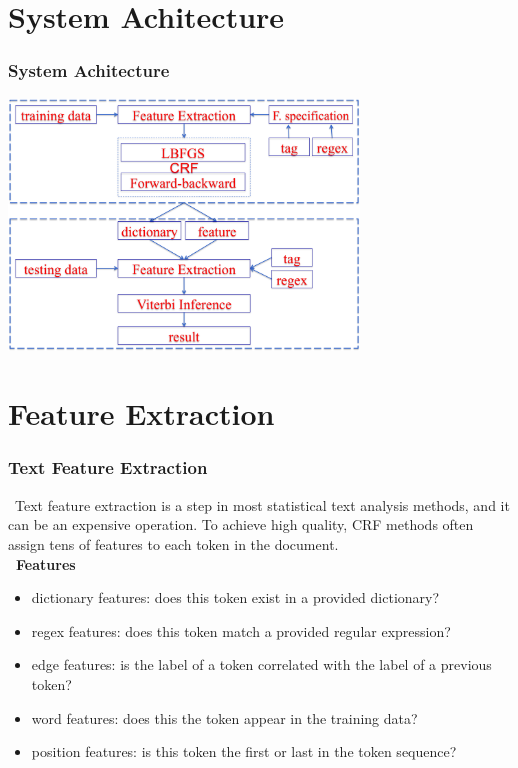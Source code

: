 \documentclass{beamer}
\begin{document}
\section{System Achitecture}

\begin{frame}
  \frametitle{System Achitecture}
  \begin{center}
  \includegraphics[height=18em]{system.png}
  \end{center}
\end{frame}


\section{Feature Extraction}
\begin{frame}
  \frametitle{Text Feature Extraction}
   \ Text feature extraction is a step in most statistical text analysis methods, and it can be an expensive operation. 
     To achieve high quality, CRF methods often assign tens of features to each token in the document. \\[1.5mm] 
     \textbf{\ Features}\vspace{-1.5mm}
     \begin{itemize}
      \item dictionary features: does this token exist in a provided dictionary? 
      \item regex features: does this token match a provided regular expression? 
      \item edge features: is the label of a token correlated with the label of a previous token? 
      \item word features: does this the token appear in the training data? 
      \item position features: is this token the first or last in the token sequence? 
     \end{itemize}
\end{frame}
\end{document}
